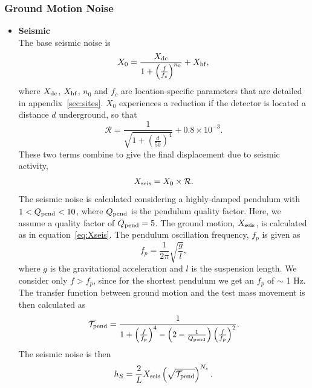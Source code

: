 \documentclass{article}
\begin{document}
\subsubsection*{Ground Motion Noise}
    \begin{itemize}
    \item \textbf{Seismic} \\
   The base seismic noise is
    \begin{equation}
    \label{eqn::baseseismic}
    X_0 = \frac{X_{\rm dc}}{1 + \left(\frac{f}{f_c}\right)^{n_0}} + X_{\rm hf},
    \end{equation}
    where $X_{\rm dc}$, $X_{\rm hf}$, $n_0$ and $f_c$ are location-specific
    parameters that are detailed in appendix~\ref{sec:sites}. $X_0$
    experiences a reduction if the detector is located a distance $d$
    underground, so that
    \begin{equation}
    \mathcal{R} = \frac{1}{\sqrt{1 + \left(\frac{d}{50}\right)^4}} + 0.8\times10^{-3} .
    \end{equation}
    These two terms combine to give the final displacement due to seismic activity,
    \begin{equation}
        X_{\rm seis} = X_0 \times \mathcal{R}.
    \label{eq:Xseis}
    \end{equation}
    The seismic noise is calculated considering a highly-damped
    pendulum with $1 < Q_{\rm pend} < 10$, where $Q_{\rm pend}$ is the
    pendulum quality factor. Here, we assume a quality factor of
    $Q_{\rm pend} = 5$. The ground motion, $X_{\rm seis}$, is calculated as
    in equation~\ref{eq:Xseis}.
    The pendulum oscillation frequency, $f_{p}$ is given as
    \begin{equation}
    f_{p} = \frac{1}{2\pi}\sqrt{\frac{g}{l}} ,
    \end{equation} 
    where $g$ is the gravitational acceleration and $l$ is the
    suspension length. We consider only $f > f_p$, since for the
    shortest pendulum we get an $f_p$ of $\sim$ 1 Hz. The transfer
    function between ground motion and the test mass movement is then calculated as
    \begin{equation}
    \mathcal{T}_{\rm pend} = \frac{1}{1 + \left(\frac{f}{f_{p}}\right)^4 - \left(2 - \frac{1}{Q_{\rm pend}}\right)\left(\frac{f}{f_{p}}\right)^2}.
    \end{equation}
        The seismic noise is then
    \begin{equation}
        \label{eqn::seismic}
        h_{S} = \frac{2}{L}X_{\rm seis}\left(\sqrt{\mathcal{T}_{\rm pend}}\right)^{N_s}.

\end{equation}
\end{itemize}
\end{document}
